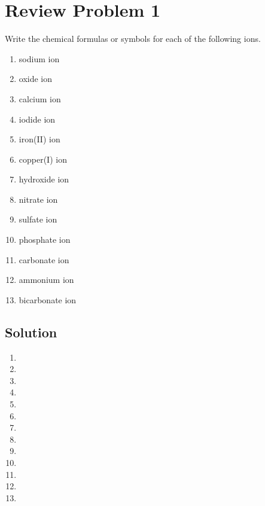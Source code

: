 \documentclass[10pt]{article}
\begin{document}
    \section{Review Problem 1}
        Write the chemical formulas or symbols for each of the following ions.
        \begin{multicols}{3}
            \begin{enumerate}[label=\alph*)]
                \item   sodium ion 
                \item   oxide ion 
                \item   calcium ion 
                \item   iodide ion
                \item   iron(II) ion 
                \item   copper(I) ion 
                \item   hydroxide ion 
                \item   nitrate ion
                \item   sulfate ion 
                \item   phosphate ion 
                \item   carbonate ion 
                \item   ammonium ion
                \item   bicarbonate ion
            \end{enumerate}
        \end{multicols}

        \subsection{Solution}
            \begin{multicols}{4}
                \begin{enumerate}[label=\alph*)]
                    \item   {}
                    \item   {}
                    \item   {}
                    \item   {}
                    \item   {}
                    \item   {}
                    \item   {}
                    \item   {}
                    \item   {}
                    \item   {}
                    \item   {}
                    \item   {}
                    \item   {}
                \end{enumerate}
            \end{multicols}
    
\end{document}
